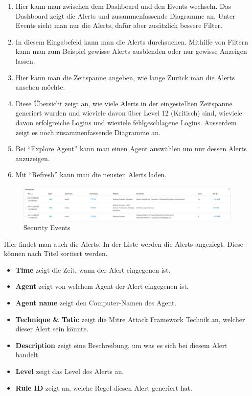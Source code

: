 \begin{enumerate}
    \item Hier kann man zwischen dem Dashboard und den Events wechseln. Das Dashboard zeigt die Alerts und zusammenfassende Diagramme an. Unter Events sieht man nur die Alerts, dafür aber zusätzlich bessere Filter.
    \item In diesem Eingabefeld kann man die Alerts durchsuchen. Mithilfe von Filtern kann man zum Beispiel gewisse Alerts ausblenden oder nur gewisse Anzeigen lassen.
    \item Hier kann man die Zeitspanne angeben, wie lange Zurück man die Alerts ansehen möchte.
    \item Diese Übersicht zeigt an, wie viele Alerts in der eingestellten Zeitspanne generiert wurden und wieviele davon über Level 12 (Kritisch) sind, wieviele davon erfolgreiche Logins und wieviele fehlgeschlagene Logins. Ausserdem zeigt es noch zusammenfassende Diagramme an.
    \item Bei ``Explore Agent'' kann man einen Agent auswählen um nur dessen Alerts anzuzeigen.
    \item Mit ``Refresh'' kann man die neusten Alerts laden.
\end{enumerate}

\begin{figure}[H]
    \centering
    \includegraphics[width=\linewidth]{../img/wazuh-se-2.png}
    \caption{Security Events}
\end{figure}

Hier findet man auch die Alerts. 
In der Liste werden die Alerts angeziegt. 
Diese können nach Titel sortiert werden. 
\begin{itemize}
    \item \textbf{Time} zeigt die Zeit, wann der Alert eingegenen ist.
    \item \textbf{Agent} zeigt von welchem Agent der Alert eingegenen ist.
    \item \textbf{Agent name} zeigt den Computer-Namen des Agent.
    \item \textbf{Technique \& Tatic} zeigt die Mitre Attack Framework Technik an, welcher dieser Alert sein könnte.
    \item \textbf{Description} zeigt eine Beschreibung, um was es sich bei diesem Alert handelt.
    \item \textbf{Level} zeigt das Level des Alerts an. 
    \item \textbf{Rule ID} zeigt an, welche Regel diesen Alert generiert hat.
\end{itemize}

